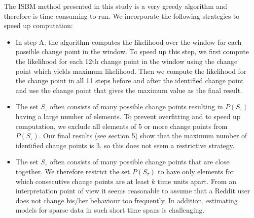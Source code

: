 The ISBM method presented in this study is a very greedy algorithm and therefore is time consuming to run. We incorporate the following strategies to speed up computation:
\begin{itemize}
	\item In step A, the algorithm computes the likelihood over the window for each possible change point in the window. To speed up this step, we first compute the likelihood for each 12th change point in the window using the change point which yields maximum likelihood. Then we compute the likelihood for the change point in all 11 steps before and after the identified change point and use the change point that gives the maximum value as the final result.  
	\item The set $S_{\tau}$ often consists of many possible change points resulting in $P(S_{\tau})$ having a large number of elements. To prevent overfitting and to speed up computation, we exclude all elements of 5 or more change points from $P(S_{\tau})$. Our final results (see section 5) show that the maximum number of identified change points is 3, so this does not seem a restrictive strategy.
	\item  The set $S_{\tau}$ often consists of many possible change points that are close together. We therefore restrict the set $P(S_{\tau})$ to have only elements for which consecutive change points are at least $k$ time units apart. From an interpretation point of view it seems reasonable to assume that a Reddit user does not change his/her behaviour too frequently. In addition, estimating models for sparse data in such short time spans is challenging. 
\end{itemize}